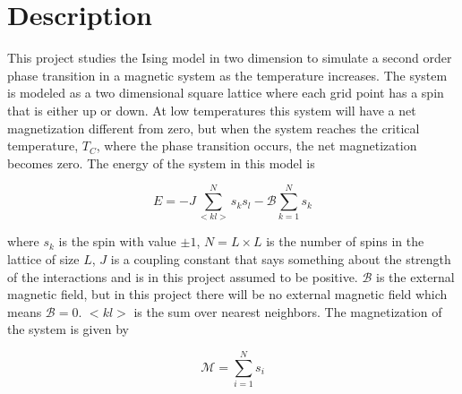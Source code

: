 \documentclass{article}
\begin{document}
\section{Description}
\label{sec:description}
This project studies the Ising model in two dimension to simulate a second order phase transition in a magnetic system as the temperature increases. The system is modeled as a two dimensional square lattice where each grid point has a spin that is either up or down. At low temperatures this system will have a net magnetization different from zero, but when the system reaches the critical temperature, $T_C$, where the phase transition occurs, the net magnetization becomes zero. The energy of the system in this model is

\begin{equation}
E = - J \sum\limits_{<kl>}^N s_ks_l - \mathcal{B} \sum\limits_{k=1}^N s_k
\label{eq:energy}
\end{equation}

\noindent where $s_k$ is the spin with value $\pm1$, $N=L\times L$ is the number of spins in the lattice of size $L$, $J$ is a coupling constant that says something about the strength of the interactions and is in this project assumed to be positive. $\mathcal{B}$ is the external magnetic field, but in this project there will be no external magnetic field which means $\mathcal{B}=0$. $<kl>$ is the sum over nearest neighbors. The magnetization of the system is given by

\begin{equation}
\mathcal{M} = \sum\limits_{i=1}^N s_i
\label{eq:magnetization}
\end{equation}
\end{document}

